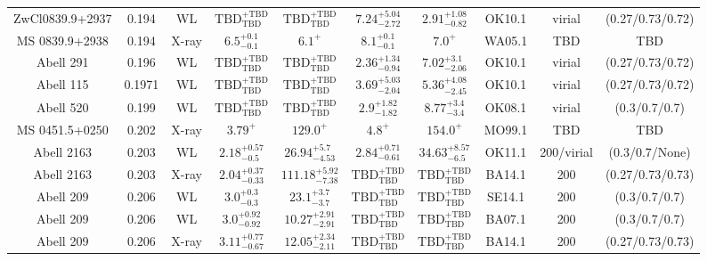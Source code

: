 \begin{table}
\begin{tabular}{cccccccccc}
ZwCl0839.9+2937 & 0.194 & WL & ${\mathrm{TBD}}^{+\mathrm{TBD}}_{\mathrm{TBD}}$ & ${\mathrm{TBD}}^{+\mathrm{TBD}}_{\mathrm{TBD}}$ & ${7.24}^{+5.04}_{-2.72}$ & ${2.91}^{+1.08}_{-0.82}$ & OK10.1 & virial & (0.27/0.73/0.72) \\
MS 0839.9+2938 & 0.194 & X-ray & ${6.5}^{+0.1}_{-0.1}$ & ${6.1}^{+}_{}$ & ${8.1}^{+0.1}_{-0.1}$ & ${7.0}^{+}_{}$ & WA05.1 & TBD & TBD \\
Abell 291 & 0.196 & WL & ${\mathrm{TBD}}^{+\mathrm{TBD}}_{\mathrm{TBD}}$ & ${\mathrm{TBD}}^{+\mathrm{TBD}}_{\mathrm{TBD}}$ & ${2.36}^{+1.34}_{-0.94}$ & ${7.02}^{+3.1}_{-2.06}$ & OK10.1 & virial & (0.27/0.73/0.72) \\
Abell 115 & 0.1971 & WL & ${\mathrm{TBD}}^{+\mathrm{TBD}}_{\mathrm{TBD}}$ & ${\mathrm{TBD}}^{+\mathrm{TBD}}_{\mathrm{TBD}}$ & ${3.69}^{+5.03}_{-2.04}$ & ${5.36}^{+4.08}_{-2.45}$ & OK10.1 & virial & (0.27/0.73/0.72) \\
Abell 520 & 0.199 & WL & ${\mathrm{TBD}}^{+\mathrm{TBD}}_{\mathrm{TBD}}$ & ${\mathrm{TBD}}^{+\mathrm{TBD}}_{\mathrm{TBD}}$ & ${2.9}^{+1.82}_{-1.82}$ & ${8.77}^{+3.4}_{-3.4}$ & OK08.1 & virial & (0.3/0.7/0.7) \\
MS 0451.5+0250 & 0.202 & X-ray & ${3.79}^{+}_{}$ & ${129.0}^{+}_{}$ & ${4.8}^{+}_{}$ & ${154.0}^{+}_{}$ & MO99.1 & TBD & TBD \\
Abell 2163 & 0.203 & WL & ${2.18}^{+0.57}_{-0.5}$ & ${26.94}^{+5.7}_{-4.53}$ & ${2.84}^{+0.71}_{-0.61}$ & ${34.63}^{+8.57}_{-6.5}$ & OK11.1 & 200/virial & (0.3/0.7/None) \\
Abell 2163 & 0.203 & X-ray & ${2.04}^{+0.37}_{-0.33}$ & ${111.18}^{+5.92}_{-7.38}$ & ${\mathrm{TBD}}^{+\mathrm{TBD}}_{\mathrm{TBD}}$ & ${\mathrm{TBD}}^{+\mathrm{TBD}}_{\mathrm{TBD}}$ & BA14.1 & 200 & (0.27/0.73/0.73) \\
Abell 209 & 0.206 & WL & ${3.0}^{+0.3}_{-0.3}$ & ${23.1}^{+3.7}_{-3.7}$ & ${\mathrm{TBD}}^{+\mathrm{TBD}}_{\mathrm{TBD}}$ & ${\mathrm{TBD}}^{+\mathrm{TBD}}_{\mathrm{TBD}}$ & SE14.1 & 200 & (0.3/0.7/0.7) \\
Abell 209 & 0.206 & WL & ${3.0}^{+0.92}_{-0.92}$ & ${10.27}^{+2.91}_{-2.91}$ & ${\mathrm{TBD}}^{+\mathrm{TBD}}_{\mathrm{TBD}}$ & ${\mathrm{TBD}}^{+\mathrm{TBD}}_{\mathrm{TBD}}$ & BA07.1 & 200 & (0.3/0.7/0.7) \\
Abell 209 & 0.206 & X-ray & ${3.11}^{+0.77}_{-0.67}$ & ${12.05}^{+2.34}_{-2.11}$ & ${\mathrm{TBD}}^{+\mathrm{TBD}}_{\mathrm{TBD}}$ & ${\mathrm{TBD}}^{+\mathrm{TBD}}_{\mathrm{TBD}}$ & BA14.1 & 200 & (0.27/0.73/0.73) \\

\end{tabular}
\end{table}
